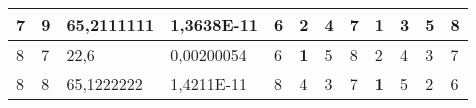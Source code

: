 \documentclass[conference]{IEEEtran}
\begin{document}
\begin{table*}[]
\begin{tabular}{|llll|llllllll|}
\multicolumn{1}{|l|}{7}                                                     & \multicolumn{1}{l|}{9}                                                        & \multicolumn{1}{l|}{65,2111111}                                                   & 1,3638E-11                     & \multicolumn{1}{l|}{6}                                                  & \multicolumn{1}{l|}{2}                                                  & \multicolumn{1}{l|}{4}                                                  & \multicolumn{1}{l|}{7}                                                  & \multicolumn{1}{l|}{\textbf{1}}                                         & \multicolumn{1}{l|}{3}                                                  & \multicolumn{1}{l|}{5}                                                  & 8                          \\ \hline
\multicolumn{1}{|l|}{8}                                                     & \multicolumn{1}{l|}{7}                                                        & \multicolumn{1}{l|}{22,6}                                                         & 0,00200054                     & \multicolumn{1}{l|}{6}                                                  & \multicolumn{1}{l|}{\textbf{1}}                                         & \multicolumn{1}{l|}{5}                                                  & \multicolumn{1}{l|}{8}                                                  & \multicolumn{1}{l|}{2}                                                  & \multicolumn{1}{l|}{4}                                                  & \multicolumn{1}{l|}{3}                                                  & 7                          \\ \hline
\multicolumn{1}{|l|}{8}                                                     & \multicolumn{1}{l|}{8}                                                        & \multicolumn{1}{l|}{65,1222222}                                                   & 1,4211E-11                     & \multicolumn{1}{l|}{8}                                                  & \multicolumn{1}{l|}{4}                                                  & \multicolumn{1}{l|}{3}                                                  & \multicolumn{1}{l|}{7}                                                  & \multicolumn{1}{l|}{\textbf{1}}                                         & \multicolumn{1}{l|}{5}                                                  & \multicolumn{1}{l|}{2}                                                  & 6                          \\ \hline

\end{tabular}
\end{table*}
\end{document}
